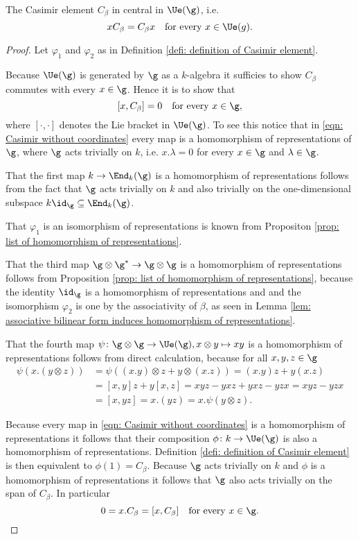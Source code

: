 \begin{lemma}
 The Casimir element $C_\beta$ in central in $\Ue(\g)$, i.e.\
 \[
  x C_\beta = C_\beta x \quad \text{for every $x \in \Ue(g)$}.
 \]
\end{lemma}
\begin{proof}
 Let $\varphi_1$ and $\varphi_2$ as in Definition \ref{defi: definition of Casimir element}.
 
 Because $\Ue(\g)$ is generated by $\g$ as a $k$-algebra it sufficies to show $C_\beta$ commutes with every $x \in \g$. Hence it is to show that
 \[
  [x,C_\beta] = 0 \quad \text{for every $x \in \g$},
 \]
 where $[\cdot,\cdot]$ denotes the Lie bracket in $\Ue(\g)$. To see this notice that in \eqref{eqn: Casimir without coordinates} every map is a homomorphism of representations of $\g$, where $\g$ acts trivially on $k$, i.e. $x.\lambda = 0$ for every $x \in \g$ and $\lambda \in \g$.
 
 That the first map $k \to \End_k(\g)$ is a homomorphism of representations follows from the fact that $\g$ acts trivially on $k$ and also trivially on the one-dimensional subspace $k \id_\g \subseteq \End_k(\g)$.
 
 That $\varphi_1$ is an isomorphism of representations is known from Propositon \ref{prop: list of homomorphism of representations}.
 
 That the third map $\g \otimes \g^* \to \g \otimes \g$ is a homomorphism of representations follows from Proposition \ref{prop: list of homomorphism of representations}, because the identity $\id_\g$ is a homomorphism of representations and and the isomorphism $\varphi_2$ is one by the associativity of $\beta$, as seen in Lemma \ref{lem: associative bilinear form induces homomorphism of representations}.
 
 That the fourth map $\psi \colon \g \otimes \g \to \Ue(\g), x \otimes y \mapsto xy$ is a homomorphism of representations follows from direct calculation, because for all $x,y,z \in \g$
 \begin{align*}
  \psi(x.(y \otimes z))
  &= \psi((x.y) \otimes z + y \otimes (x.z))
  = (x.y)z + y(x.z) \\
  &= [x,y]z + y[x,z]
  = xyz - yxz + yxz - yzx
  = xyz - yzx \\
  &= [x,yz]
  = x.(yz)
  = x.\psi(y \otimes z).
 \end{align*}
 
 Because every map in \eqref{eqn: Casimir without coordinates} is a homomorphism of representations it follows that their composition $\phi \colon k \to \Ue(\g)$ is also a homomorphism of representations. Definition \ref{defi: definition of Casimir element} is then equivalent to $\phi(1) = C_\beta$. Because $\g$ acts trivially on $k$ and $\phi$ is a homomorphism of representations it follows that $\g$ also acts trivially on the span of $C_\beta$. In particular
 \[
  0 = x.C_\beta = [x,C_\beta] \quad \text{for every $x \in \g$}.
  \qedhere
 \]
\end{proof}


